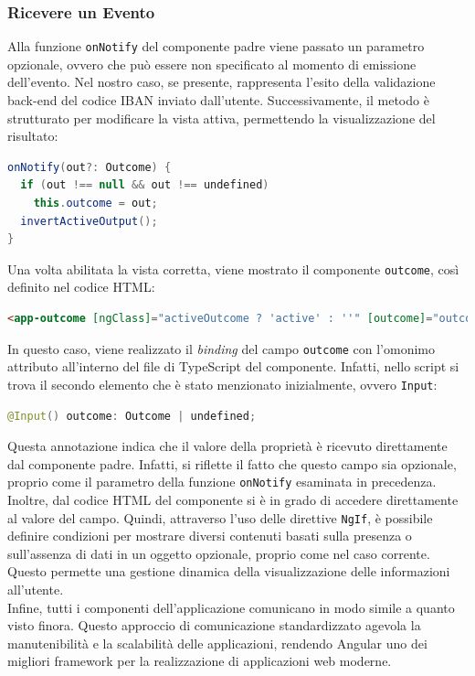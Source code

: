 \subsubsection{Ricevere un Evento}
Alla funzione \texttt{onNotify} del componente padre viene passato un parametro opzionale, ovvero che può essere non specificato al momento di emissione dell’evento. Nel nostro caso, se presente, rappresenta l’esito della validazione back-end del codice IBAN inviato dall’utente. Successivamente, il metodo è strutturato per modificare la vista attiva, permettendo la visualizzazione del risultato:
\begin{lstlisting}[language=Java, caption=Funzione richiamata quando viene ricevuto un evento.]
onNotify(out?: Outcome) {
  if (out !== null && out !== undefined)
    this.outcome = out;
  invertActiveOutput();
}
\end{lstlisting}
Una volta abilitata la vista corretta, viene mostrato il componente \texttt{outcome}, così definito nel codice HTML:
\begin{lstlisting}[language=HTML, caption=Dichiarazione del componente attivato in seguito alla ricezione di un evento.]
<app-outcome [ngClass]="activeOutcome ? 'active' : ''" [outcome]="outcome"></app-outcome>
\end{lstlisting}
In questo caso, viene realizzato il \textit{binding} del campo \texttt{outcome} con l’omonimo attributo all’interno del file di TypeScript del componente.
\newpage
Infatti, nello script si trova il secondo elemento che è stato menzionato inizialmente, ovvero \texttt{Input}:
\begin{lstlisting}[language=Java, caption=Dichiarazione di un campo che riceve il proprio valore dal componente padre.]
@Input() outcome: Outcome | undefined;
\end{lstlisting}
Questa annotazione indica che il valore della proprietà è ricevuto direttamente dal componente padre. Infatti, si riflette il fatto che questo campo sia opzionale, proprio come il parametro della funzione \texttt{onNotify} esaminata in precedenza.\\
Inoltre, dal codice HTML del componente si è in grado di accedere direttamente al valore del campo. Quindi, attraverso l’uso delle direttive \texttt{NgIf}, è possibile definire condizioni per mostrare diversi contenuti basati sulla presenza o sull'assenza di dati in un oggetto opzionale, proprio come nel caso corrente. Questo permette una gestione dinamica della visualizzazione delle informazioni all’utente.\\
Infine, tutti i componenti dell’applicazione comunicano in modo simile a quanto visto finora. Questo approccio di comunicazione standardizzato agevola la manutenibilità e la scalabilità delle applicazioni, rendendo Angular uno dei migliori framework per la realizzazione di applicazioni web moderne.